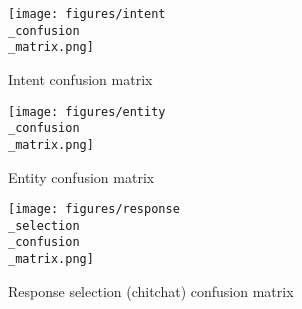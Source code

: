 \documentclass[journal, 11pt]{IEEEtran}
\begin{document}

% 
% 



\onecolumn

\begin{figure}[ht]
    \centering
    \texttt{[image: figures/intent\\\_confusion\\\_matrix.png]}
    \caption{Intent confusion matrix}
    \label{fig:intent-conf-mat}
\end{figure}

\begin{figure}[ht]
    \centering
    \texttt{[image: figures/entity\\\_confusion\\\_matrix.png]}
    \caption{Entity confusion matrix}
    \label{fig:ents-conf-mat}
\end{figure}

\begin{figure}[ht]
    \centering
    \texttt{[image: figures/response\\\_selection\\\_confusion\\\_matrix.png]}
    \caption{Response selection (chitchat) confusion matrix}
    \label{fig:resp-sel-conf-mat}
\end{figure}


\ifCLASSOPTIONcaptionsoff
  \newpage
\fi
\end{document}
